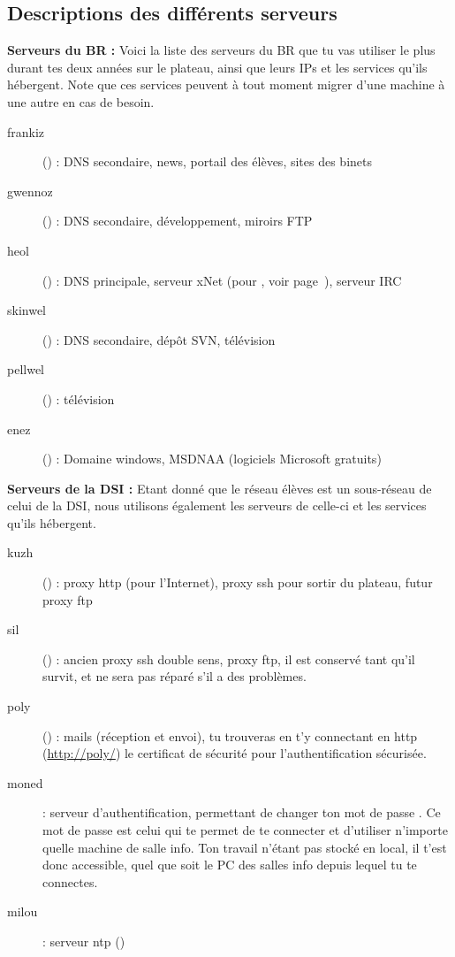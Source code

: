 \subsection{Descriptions des différents serveurs}
{\bf Serveurs du BR :} Voici la liste des serveurs du BR que tu vas
utiliser le plus durant tes deux années sur le plateau, ainsi que
leurs IPs et les services qu'ils hébergent. Note que ces services
peuvent à tout moment migrer d'une machine à une autre en cas de
besoin.


\begin{description}
        \item[frankiz] () : DNS secondaire,
        news, portail des élèves, sites des binets
        \item[gwennoz] () : DNS secondaire,
        développement, miroirs FTP
        \item[heol] () : DNS principale,
        serveur xNet (pour , voir page~\pageref{qrezix}), serveur IRC
        \item[skinwel] () : DNS secondaire,
        dépôt SVN, télévision
	\item[pellwel] () : télévision
    \item[enez] () : Domaine windows, MSDNAA (logiciels Microsoft gratuits)
\end {description}

{\bf Serveurs de la DSI : }Etant donné que le réseau élèves est un
sous-réseau de celui de la DSI, nous utilisons également les
serveurs de celle-ci et les services qu'ils hébergent.

\begin{description}
        \item[kuzh] () : proxy http (pour l'Internet), proxy ssh pour sortir du plateau, futur proxy ftp
        \item[sil] () : ancien proxy ssh double sens, proxy ftp, il est conservé tant qu'il survit, et ne sera pas réparé s'il a des problèmes.
        \item[poly] () : mails (réception et envoi), tu trouveras en t'y connectant en http (\url{http://poly/}) le certificat de sécurité pour l'authentification sécurisée.
        \item[moned] : serveur d'authentification, permettant de
        changer ton mot de passe . Ce mot de passe est celui qui
        te permet de te connecter et d'utiliser n'importe
        quelle machine de salle info. Ton travail n'étant pas stocké
        en local, il t'est donc accessible, quel que soit le PC des salles info depuis
        lequel tu te connectes.
    \item[milou] : serveur ntp ()
\end {description}

